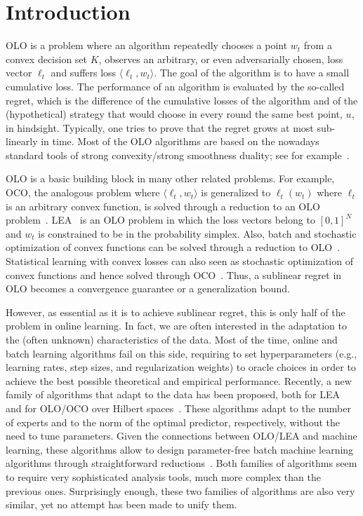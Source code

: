 \section{Introduction}
\label{section:introduction}

\ac{OLO} is a problem where an algorithm repeatedly chooses a point $w_t$ from
a convex decision set $K$, observes an arbitrary, or even adversarially chosen,
loss vector $\ell_t$ and suffers loss $\langle \ell_t, w_t \rangle$. The goal
of the algorithm is to have a small cumulative loss. The performance of an
algorithm is evaluated by the so-called regret, which is the difference of the
cumulative losses of the algorithm and of the (hypothetical) strategy that
would choose in every round the same best point, $u$, in hindsight. Typically,
one tries to prove that the regret grows at most sub-linearly in time. Most of
the \ac{OLO} algorithms are based on the nowadays standard tools of strong
convexity/strong smoothness duality; see for example~\citet{Shalev-Shwartz12}.

\ac{OLO} is a basic building block in many other related problems. For example,
\ac{OCO}, the analogous problem where $\langle \ell_t, w_t \rangle$ is
generalized to $\ell_t(w_t)$ where $\ell_t$ is an arbitrary convex function, is
solved through a reduction to an \ac{OLO} problem~\citep{Cesa-BianchiL06,
Shalev-Shwartz12}. \ac{LEA}~\citep{LittlestoneW94, Vovk98, Cesa-BianchiFHHSW97}
is an \ac{OLO} problem in which the loss vectors belong to $[0,1]^N$ and $w_t$
is constrained to be in the probability simplex. Also, batch and stochastic
optimization of convex functions can be solved through a reduction to
\ac{OLO}~\citep{Shalev-Shwartz12}. Statistical learning with convex losses can
also seen as stochastic optimization of convex functions and hence solved
through \ac{OCO}~\citep{Munro1951}. Thus, a sublinear regret in \ac{OLO} becomes
a convergence guarantee or a generalization bound.

However, as essential as it is to achieve sublinear regret, this is only half of
the problem in online learning. In fact, we are often interested in the
adaptation to the (often unknown) characteristics of the data. Most of the time,
online and batch learning algorithms fail on this side, requiring to set
hyperparameters (e.g., learning rates, step sizes, and regularization weights)
to oracle choices in order to achieve the best possible theoretical and
empirical performance. Recently, a new family of algorithms that adapt to the
data has been proposed, both for \ac{LEA}~\citep{ChaudhuriYH09, ChernovV10,
LuoE14, LuoS15, KoolenE15} and for \ac{OLO}/\ac{OCO} over Hilbert
spaces~\citep{StreeterM12, Orabona13, McMahanA13, McMahanO14, Orabona14}. These
algorithms adapt to the number of experts and to the norm of the optimal
predictor, respectively, without the need to tune parameters. Given the
connections between \ac{OLO}/\ac{LEA} and machine learning, these algorithms
allow to design parameter-free batch machine learning algorithms through
straightforward reductions~\citep{Orabona14,LuoS15}. Both families of algorithms
seem to require very sophisticated analysis tools, much more complex than the
previous ones. Surprisingly enough, these two families of algorithms are also
very similar, yet no attempt has been made to unify them.

